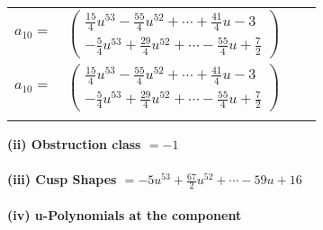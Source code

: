 \documentclass[1p]{elsarticle_modified}
\theoremstyle{definition}
\begin{document}
\begin{tabular}{m{7pt} m{180pt} m{7pt} m{180pt} }
\flushright $a_{10}=$&$\begin{pmatrix}\frac{15}{4} u^{53}-\frac{55}{4} u^{52}+\cdots+\frac{41}{4} u-3\\-\frac{5}{4} u^{53}+\frac{29}{4} u^{52}+\cdots-\frac{55}{4} u+\frac{7}{2}\end{pmatrix}$\\ \flushright $a_{10}=$&$\begin{pmatrix}\frac{15}{4} u^{53}-\frac{55}{4} u^{52}+\cdots+\frac{41}{4} u-3\\-\frac{5}{4} u^{53}+\frac{29}{4} u^{52}+\cdots-\frac{55}{4} u+\frac{7}{2}\end{pmatrix}$\\&\end{tabular}
\flushleft \textbf{(ii) Obstruction class $= -1$}\\~\\
\flushleft \textbf{(iii) Cusp Shapes $= -5 u^{53}+\frac{67}{2} u^{52}+\cdots-59 u+16$}\\~\\
\newpage\renewcommand{\arraystretch}{1}
\flushleft \textbf{(iv) u-Polynomials at the component}\newline \\
\end{document}
